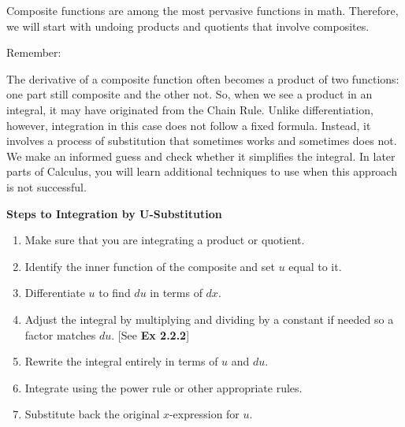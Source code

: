 Composite functions are among the most pervasive functions in math. Therefore, we will start with undoing products and quotients that involve composites. \par

Remember: \par

\begin{center}
\end{center}

The derivative of a composite function often becomes a product of two functions: one part still composite and the other not. So, when we see a product in an integral, it may have originated from the Chain Rule. Unlike differentiation, however, integration in this case does not follow a fixed formula. Instead, it involves a process of substitution that sometimes works and sometimes does not. We make an informed guess and check whether it simplifies the integral. In later parts of Calculus, you will learn additional techniques to use when this approach is not successful. \par

\textbf{Steps to Integration by U-Substitution} \par

\begin{enumerate}
    \item Make sure that you are integrating a product or quotient.
    \item Identify the inner function of the composite and set $u$ equal to it.
    \item Differentiate $u$ to find $du$ in terms of $dx$.
    \item Adjust the integral by multiplying and dividing by a constant if needed so a factor matches $du$. [See \textbf{Ex 2.2.2}]
    \item Rewrite the integral entirely in terms of $u$ and $du$.
    \item Integrate using the power rule or other appropriate rules.
    \item Substitute back the original $x$-expression for $u$.
\end{enumerate}

